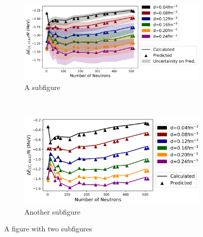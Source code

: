 \begin{figure}[H]
\centering
\begin{subfigure}{0.48\textwidth}%
  \includegraphics[width=\textwidth]{Images/Chapter7/NeutronMatter/GP_PNM_MSU_n_0_25_uncertainity.png}%
  \caption{A subfigure}
  \label{fig:sub1}
\end{subfigure}~%
\begin{subfigure}{0.48\textwidth}%
  \includegraphics[width=\textwidth]{Images/Chapter7/NeutronMatter/GP_PNM_MSU_n_0_25.png}%
  \caption{Another subfigure}
  \label{fig:sub2}
\end{subfigure}
\caption{A figure with two subfigures}
\label{pnm_mp_all_n_0_25}
\end{figure}